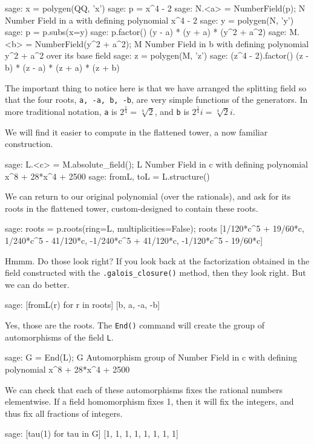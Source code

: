 %
\begin{sageexample}
sage: x = polygen(QQ, 'x')
sage: p = x^4 - 2
sage: N.<a> = NumberField(p); N
Number Field in a with defining polynomial x^4 - 2
sage: y = polygen(N, 'y')
sage: p = p.subs(x=y)
sage: p.factor()
(y - a) * (y + a) * (y^2 + a^2)
sage: M.<b> = NumberField(y^2 + a^2); M
Number Field in b with defining polynomial y^2 + a^2 over
its base field
sage: z = polygen(M, 'z')
sage: (z^4 - 2).factor()
(z - b) * (z - a) * (z + a) * (z + b)
\end{sageexample}
%
The important thing to notice here is that we have arranged the splitting field so that the four roots, \verb?a, -a, b, -b?, are very simple functions of the generators.  In more traditional notation, \verb?a? is $2^{\frac{1}{4}}=\sqrt[4]{2}$, and \verb?b? is $2^{\frac{1}{4}}i=\sqrt[4]{2}i$.\par
%
We will find it easier to compute in the flattened tower, a now familiar construction.
%
\begin{sageexample}
sage: L.<c> = M.absolute_field(); L
Number Field in c with defining polynomial x^8 + 28*x^4 + 2500
sage: fromL, toL = L.structure()
\end{sageexample}
%
We can return to our original polynomial (over the rationals), and ask for its roots in the flattened tower, custom-designed to contain these roots.
%
\begin{sageexample}
sage: roots = p.roots(ring=L, multiplicities=False); roots
[1/120*c^5 +  19/60*c,
 1/240*c^5 - 41/120*c,
-1/240*c^5 + 41/120*c,
-1/120*c^5 -  19/60*c]
\end{sageexample}
%
Hmmm.  Do those look right?  If you look back at the factorization obtained in the field constructed with the \verb?.galois_closure()? method, then they look right.  But we can do better.
%
\begin{sageexample}
sage: [fromL(r) for r in roots]
[b, a, -a, -b]
\end{sageexample}
%
Yes, those are the roots.
%
The \verb?End()? command will create the group of automorphisms of the field \verb?L?.
%
\begin{sageexample}
sage: G = End(L); G
Automorphism group of Number Field in c with
defining polynomial x^8 + 28*x^4 + 2500
\end{sageexample}
%
We can check that each of these automorphisms fixes the rational numbers elementwise.  If a field homomorphism fixes 1, then it will fix the integers, and thus fix all fractions of integers.
%
\begin{sageexample}
sage: [tau(1) for tau in G]
[1, 1, 1, 1, 1, 1, 1, 1]
\end{sageexample}
